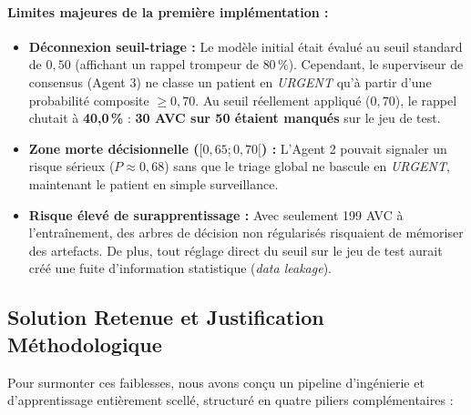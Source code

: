 \paragraph{Limites majeures de la première implémentation :}
\begin{itemize}
    \item \textbf{Déconnexion seuil-triage :} Le modèle initial était évalué au seuil standard de $0{,}50$ (affichant un rappel trompeur de $80\,\%$). Cependant, le superviseur de consensus (Agent 3) ne classe un patient en \emph{URGENT} qu'à partir d'une probabilité composite $\ge 0{,}70$. Au seuil réellement appliqué ($0{,}70$), le rappel chutait à \textbf{40{,}0\,\%} : \textbf{30 AVC sur 50 étaient manqués} sur le jeu de test.
    \item \textbf{Zone morte décisionnelle ($[0{,}65 ; 0{,}70[$) :} L'Agent 2 pouvait signaler un risque sérieux ($P \approx 0{,}68$) sans que le triage global ne bascule en \emph{URGENT}, maintenant le patient en simple surveillance.
    \item \textbf{Risque élevé de surapprentissage :} Avec seulement 199 AVC à l'entraînement, des arbres de décision non régularisés risquaient de mémoriser des artefacts. De plus, tout réglage direct du seuil sur le jeu de test aurait créé une fuite d'information statistique (\emph{data leakage}).
\end{itemize}

\subsection{Solution Retenue et Justification Méthodologique}

Pour surmonter ces faiblesses, nous avons conçu un pipeline d'ingénierie et d'apprentissage entièrement scellé, structuré en quatre piliers complémentaires :


